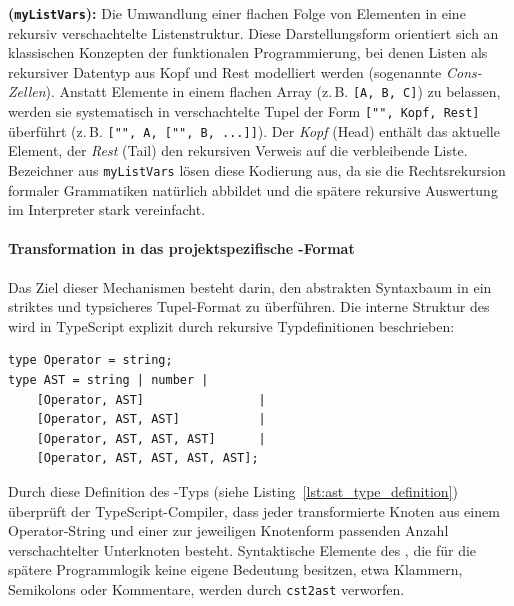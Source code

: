 \begin{definition}
\label{def:cons-kodierung}
\textbf{ (\texttt{myListVars}):}
Die Umwandlung einer flachen Folge von Elementen in eine rekursiv verschachtelte Listenstruktur. Diese Darstellungsform orientiert sich an klassischen Konzepten der funktionalen Programmierung, bei denen Listen als rekursiver Datentyp aus Kopf und Rest modelliert werden (sogenannte \textit{Cons-Zellen}). Anstatt Elemente in einem flachen Array (z.\,B. \texttt{[A, B, C]}) zu belassen, werden sie systematisch in verschachtelte Tupel der Form \texttt{["\textperiodcentered", Kopf, Rest]} überführt (z.\,B. \texttt{["\textperiodcentered", A, ["\textperiodcentered", B, ...]]}). Der \textit{Kopf} (Head) enthält das aktuelle Element, der \textit{Rest} (Tail) den rekursiven Verweis auf die verbleibende Liste. Bezeichner aus \texttt{myListVars} lösen diese Kodierung aus, da sie die Rechtsrekursion formaler Grammatiken natürlich abbildet und die spätere rekursive Auswertung im Interpreter stark vereinfacht.
\end{definition}

\paragraph{Transformation in das projektspezifische -Format}

Das Ziel dieser Mechanismen besteht darin, den abstrakten Syntaxbaum in ein striktes und typsicheres Tupel-Format zu überführen. Die interne Struktur des  wird in TypeScript explizit durch rekursive Typdefinitionen beschrieben:

\begin{listing}[htbp]
    \caption{Die typsichere Definition des AST}
    \label{lst:ast_type_definition}
\begin{verbatim}
type Operator = string;
type AST = string | number | 
    [Operator, AST]                |
    [Operator, AST, AST]           |
    [Operator, AST, AST, AST]      |
    [Operator, AST, AST, AST, AST];
\end{verbatim}
\end{listing}

Durch diese Definition des -Typs (siehe Listing~\ref{lst:ast_type_definition}) überprüft der TypeScript-Compiler, dass jeder transformierte Knoten aus einem Operator-String und einer zur jeweiligen Knotenform passenden Anzahl verschachtelter Unterknoten besteht. Syntaktische Elemente des , die für die spätere Programmlogik keine eigene Bedeutung besitzen, etwa Klammern, Semikolons oder Kommentare, werden durch \texttt{cst2ast} verworfen.

